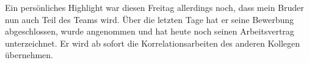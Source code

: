 Ein persönliches Highlight war diesen Freitag allerdings noch, dass mein Bruder nun auch Teil des Teams wird.
Über die letzten Tage hat er seine Bewerbung abgeschlossen, wurde angenommen und hat heute noch seinen Arbeitsvertrag unterzeichnet.
Er wird ab sofort die Korrelationsarbeiten des anderen Kollegen übernehmen.
